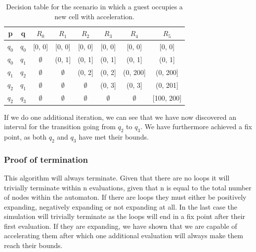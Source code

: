 \documentclass[12pt]{article}
\begin{document}
\begin{table}[t!]
	\begin{tabular}{ |c|c|c|c|c|c|c|c| }
		\hline
		p		& q 	& $R_0$ 		& $R_1$			& $R_2$			& $R_3$			& $R_4$ 		& $R_5$ \\
		\hline
		$q_0$	& $q_0$ & [0, 0] 		& [0, 0] 		& [0, 0] 		& [0, 0]		& [0, 0]		& [0, 0] \\
		$q_0$	& $q_1$ & $\emptyset$ 	& (0, 1]		& (0, 1] 		& (0, 1]		& (0, 1] 		& (0, 1] \\
		$q_1$	& $q_2$ & $\emptyset$ 	& $\emptyset$ 	& (0, 2] 		& (0, 2]		& (0, 200] 		& (0, 200] \\
		$q_2$	& $q_1$ & $\emptyset$ 	& $\emptyset$ 	& $\emptyset$	& (0, 3]		& (0, 3] 		& (0, 201] \\
		$q_2$	& $q_3$ & $\emptyset$ 	& $\emptyset$ 	& $\emptyset$	& $\emptyset$	& $\emptyset$	& [100, 200] \\
		\hline
	\end{tabular}
	\centering
	\caption{Decision table for the scenario in which a guest occupies a new cell with acceleration.}
	\label{table:table_example_acc}
\end{table}

If we do one additional iteration, we can see that we have now discovered an interval for the transition going from $q_2$ to $q_3$. We have furthermore achieved a fix point, as both $q_2$ and $q_3$ have met their bounds.

\subsubsection{Proof of termination}
This algorithm will always terminate. Given that there are no loops it will trivially terminate within n evaluations, given that n is equal to the total number of nodes within the automaton. If there are loops they must either be positively expanding, negatively expanding or not expanding at all. In the last case the simulation will trivially terminate as the loops will end in a fix point after their first evaluation. If they are expanding, we have shown that we are capable of accelerating them after which one additional evaluation will always make them reach their bounds. 
\end{document}
